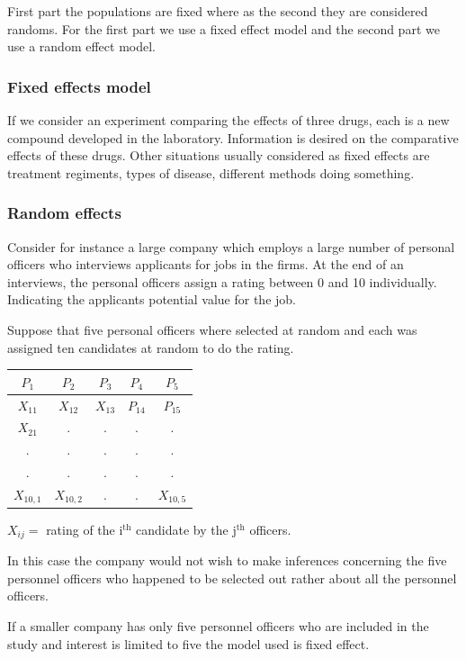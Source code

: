 \documentclass[11pt,a4paper]{article}
\theoremstyle{definition}
\begin{document}
First part the populations are fixed where as the second they are considered randoms. For the first part we use a fixed effect model and the second part we use a random effect model.

\subsubsection*{Fixed effects model}
If we consider an experiment comparing the effects of three drugs, each is a new compound developed in the laboratory. Information is desired on the comparative effects of these drugs. Other situations usually considered as fixed effects are treatment regiments, types of disease, different methods doing something.

\subsubsection*{Random effects}
Consider for instance a large company which employs a large number of personal officers who interviews applicants for jobs in the firms. At the end of an interviews, the personal officers assign a rating between 0 and 10 individually. Indicating the applicants potential value for the job.

Suppose that five personal officers where selected at random and each was assigned ten candidates at random to do the rating.\\

\begin{table}[h!]
\centering
\begin{tabular}{|c|c|c|c|c|}
\hline $P_1$ & $P_2$ & $P_3$ & $P_4$ & $P_5$\\
\hline $X_{11}$ & $X_{12}$ & $X_{13}$ & $P_{14}$ & $P_{15}$\\
$X_{21}$&.&.&.&.\\
.&.&.&.&.\\
.&.&.&.&.\\
$X_{10,1}$ & $X_{10,2}$&.&.&$X_{10,5}$\\
\hline
\end{tabular}
\end{table} 

$X_{ij}=$ rating of the i$^{\text{th}}$ candidate by the j$^{\text{th}}$ officers.

In this case the company would not wish to make inferences concerning the five personnel officers who happened to be selected out rather about all the personnel officers.

If a smaller company has only five personnel officers who are included in the study and interest is limited to five the model used is fixed effect.
\end{document}
